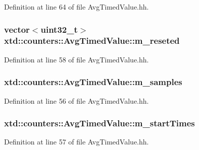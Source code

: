 Definition at line 64 of file Avg\-Timed\-Value.\-hh.

\hypertarget{classxtd_1_1counters_1_1AvgTimedValue_a9f3477cd3eb3fb75f2ba8d75d706eb88}{
\subsubsection[{m\-\_\-reseted}]{\setlength{\rightskip}{0pt plus 5cm}vector$<$uint32\-\_\-t$>$ xtd\-::counters\-::\-Avg\-Timed\-Value\-::m\-\_\-reseted}}\label{classxtd_1_1counters_1_1AvgTimedValue_a9f3477cd3eb3fb75f2ba8d75d706eb88}


Definition at line 58 of file Avg\-Timed\-Value.\-hh.

\hypertarget{classxtd_1_1counters_1_1AvgTimedValue_af33c7f1f69e37ef49e4195de8f4ac6e2}{
\subsubsection[{m\-\_\-samples}]{ xtd\-::counters\-::\-Avg\-Timed\-Value\-::m\-\_\-samples}}\label{classxtd_1_1counters_1_1AvgTimedValue_af33c7f1f69e37ef49e4195de8f4ac6e2}


Definition at line 56 of file Avg\-Timed\-Value.\-hh.

\hypertarget{classxtd_1_1counters_1_1AvgTimedValue_aff4e550c326e9e16ad2f9e5ff384ae2e}{
\subsubsection[{m\-\_\-start\-Times}]{ xtd\-::counters\-::\-Avg\-Timed\-Value\-::m\-\_\-start\-Times}}\label{classxtd_1_1counters_1_1AvgTimedValue_aff4e550c326e9e16ad2f9e5ff384ae2e}


Definition at line 57 of file Avg\-Timed\-Value.\-hh.

